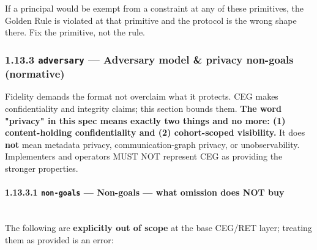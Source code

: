 \documentclass[11pt]{article}
\begin{document}
If a principal would be exempt from a constraint at any of these primitives, the Golden Rule is violated at that primitive and the protocol is the wrong shape there. Fix the primitive, not the rule.


\subsubsection*{1.13.3 \texttt{adversary} — Adversary model \& privacy non-goals (normative)}


Fidelity demands the format not overclaim what it protects. CEG makes confidentiality and integrity claims; this section bounds them. \textbf{The word "privacy" in this spec means exactly two things and no more: (1) content-holding confidentiality and (2) cohort-scoped visibility.} It does \textbf{not} mean metadata privacy, communication-graph privacy, or unobservability. Implementers and operators MUST NOT represent CEG as providing the stronger properties.


\paragraph{1.13.3.1 \texttt{non-goals} — Non-goals — what omission does NOT buy}\mbox{}\\


The following are \textbf{explicitly out of scope} at the base CEG/RET layer; treating them as provided is an error:
\end{document}
